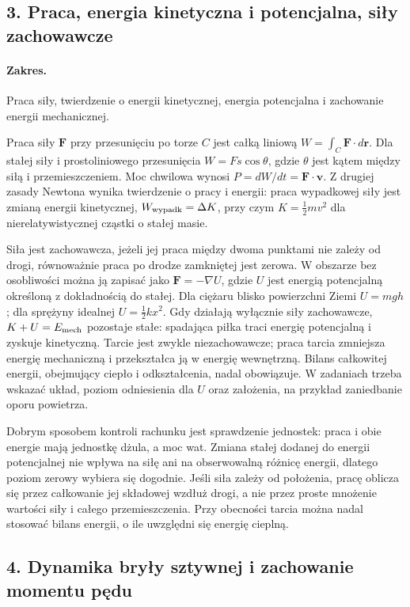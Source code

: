 \documentclass[11pt,a4paper]{article}
\begin{document}
\subsection{3. Praca, energia kinetyczna i potencjalna, siły zachowawcze}
\paragraph{Zakres.} Praca siły, twierdzenie o energii kinetycznej, energia potencjalna i zachowanie energii mechanicznej.

Praca siły $\mathbf F$ przy przesunięciu po torze $C$ jest całką liniową $W=\int_C\mathbf F\cdot d\mathbf r$. Dla stałej siły i prostoliniowego przesunięcia $W=Fs\cos\theta$, gdzie $\theta$ jest kątem między siłą i przemieszczeniem. Moc chwilowa wynosi $P=dW/dt=\mathbf F\cdot\mathbf v$. Z drugiej zasady Newtona wynika twierdzenie o pracy i energii: praca wypadkowej siły jest zmianą energii kinetycznej, $W_{\rm wypadk}= \Delta K$, przy czym $K=\tfrac12mv^2$ dla nierelatywistycznej cząstki o stałej masie.

Siła jest zachowawcza, jeżeli jej praca między dwoma punktami nie zależy od drogi, równoważnie praca po drodze zamkniętej jest zerowa. W obszarze bez osobliwości można ją zapisać jako $\mathbf F=-\nabla U$, gdzie $U$ jest energią potencjalną określoną z dokładnością do stałej. Dla ciężaru blisko powierzchni Ziemi $U=mgh$; dla sprężyny idealnej $U=\tfrac12kx^2$. Gdy działają wyłącznie siły zachowawcze, $K+U=E_{\rm mech}$ pozostaje stałe: spadająca piłka traci energię potencjalną i zyskuje kinetyczną. Tarcie jest zwykle niezachowawcze; praca tarcia zmniejsza energię mechaniczną i przekształca ją w energię wewnętrzną. Bilans całkowitej energii, obejmujący ciepło i odkształcenia, nadal obowiązuje. W zadaniach trzeba wskazać układ, poziom odniesienia dla $U$ oraz założenia, na przykład zaniedbanie oporu powietrza.

Dobrym sposobem kontroli rachunku jest sprawdzenie jednostek: praca i obie energie mają jednostkę dżula, a moc wat. Zmiana stałej dodanej do energii potencjalnej nie wpływa na siłę ani na obserwowalną różnicę energii, dlatego poziom zerowy wybiera się dogodnie. Jeśli siła zależy od położenia, pracę oblicza się przez całkowanie jej składowej wzdłuż drogi, a nie przez proste mnożenie wartości siły i całego przemieszczenia. Przy obecności tarcia można nadal stosować bilans energii, o ile uwzględni się energię cieplną.

\subsection{4. Dynamika bryły sztywnej i zachowanie momentu pędu}
\end{document}
